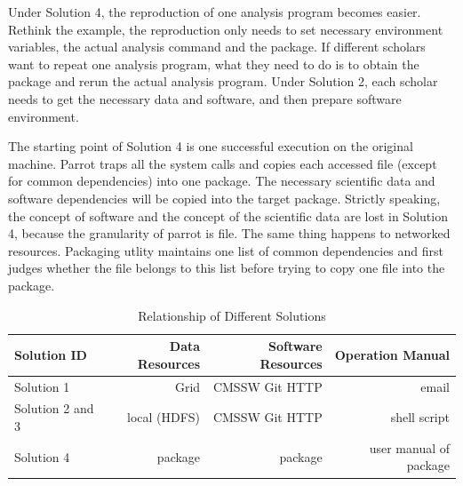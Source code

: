 \documentclass{sig-alternate}
\begin{document}
Under Solution 4, the reproduction of one analysis program becomes easier.
Rethink the example, the reproduction only needs
to set necessary environment variables, the actual analysis command
and the package. If different scholars want to repeat one analysis program,
what they need to do is to obtain the package and rerun the actual analysis
program. Under Solution 2, each scholar needs to get the necessary data and
software, and then prepare software environment. 

The starting point of Solution 4 is one successful execution on the original machine. 
Parrot traps all the system calls and copies each accessed file (except for common dependencies) into one package.
The necessary scientific data and software dependencies will be copied into the target package.
Strictly speaking, the concept of software and the concept of the scientific data are lost in Solution 4, because
the granularity of parrot is file.
The same thing happens to networked resources.
Packaging utlity maintains one list of common dependencies and first judges whether the file belongs to this list before trying to copy one file into the package.

\begin{table}
    \centering
    \begin{tabular}{|l|r|r|r|}
        \hline
        \bf Solution ID & \bf Data Resources &\bf Software Resources & \bf Operation Manual \\ \hline
        Solution 1& Grid & CMSSW Git HTTP & email \\ \hline
        Solution 2 and 3& local (HDFS) & CMSSW Git HTTP & shell script \\ \hline
        Solution 4& package & package & user manual of package \\ \hline
    \end{tabular}
    \caption{Relationship of Different Solutions}
    \label{table:relationship}
\end{table}

\end{document}
